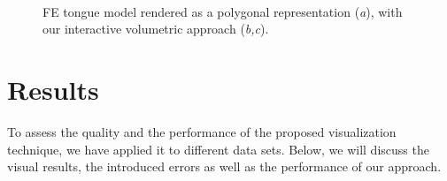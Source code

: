 \documentclass[review,journal]{vgtc}         %
\begin{document}
\begin{figure}
    \centering 
    \\
    \caption{FE tongue model rendered as a polygonal representation ({\it a}), with our interactive volumetric approach ({\it b,c}).}
    \label{fig:tongue}
\end{figure}

\section{Results}\label{sec:results}

To assess the quality and the performance of the proposed visualization technique, we have applied it to different data sets. Below, we will discuss the visual results, the introduced errors as well as the performance of our approach.
\end{document}

